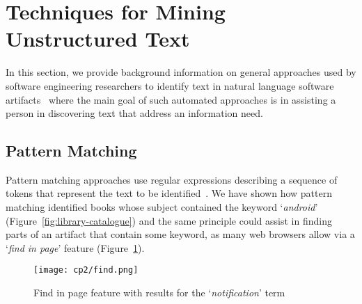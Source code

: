 


\section{Techniques for Mining Unstructured Text}
\label{cp2:general-approaches}




In this section, we provide background information on general 
approaches used
by software engineering researchers 
to identify text in natural language software artifacts~\cite{Bavota2016}
where the main goal of such automated approaches is in assisting a person in discovering
text that address an information need.







\subsection{Pattern Matching}
\label{cp2:pattern-matching}



Pattern matching approaches use regular expressions describing
a sequence of tokens that represent
the text to be identified~\cite{Bavota2016}. 
We have shown how pattern matching identified
books whose subject contained
the keyword `\textit{android}' (Figure~\ref{fig:library-catalogue})
and the same principle could assist 
in finding parts of an artifact that contain some keyword, 
as many web browsers allow via a `\textit{find in page}' feature (Figure~\ref{fig:find-in-page}).






\medskip
\begin{figure}[h!]
    \centering
    \texttt{[image: cp2/find.png]}
    \caption{Find in page feature with results for the `\textit{notification}' term}
    \label{fig:find-in-page}
\end{figure}


